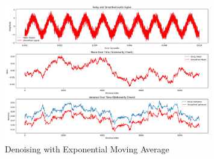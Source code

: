 \documentclass[a4paper,12pt]{article} %
\begin{document}
\begin{figure}[h]
\centering
\includegraphics[width=0.8\textwidth]{Q3_EMA_0.9.png}
\caption{Denoising with Exponential Moving Average}
\end{figure}

\clearpage
\end{document}
